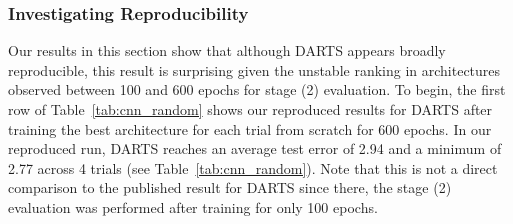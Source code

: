 \documentclass[acmlarge, nonacm]{acmart}
\begin{document}
\subsubsection{Investigating Reproducibility}
\label{ssec:cnn_reproduce}
Our results in this section show that although DARTS appears broadly reproducible, this result is surprising given the unstable ranking in architectures observed between 100 and 600 epochs for stage (2) evaluation.
To begin, the first row of Table~\ref{tab:cnn_random} shows our reproduced results for DARTS after training the best architecture for each trial from scratch for 600 epochs.  In our reproduced run, DARTS reaches an average test error of 2.94 and a minimum of 2.77 across 4 trials (see Table~\ref{tab:cnn_random}).  Note that this is not a direct comparison to the published result for DARTS since there, the stage (2) evaluation was performed after training for only 100 epochs.  
\begingroup
\setlength{\tabcolsep}{3pt}
\begin{table}[h]
    \centering
    \caption{\textbf{CIFAR-10 Benchmark: Ranking of Intermediate Test Error for DARTS.}  Architectures are retrained from scratch using the proxyless network and the error on the test set is reported after training for the indicated number of epochs.  Rank is calculated across the 4 trials.  We also show the average over 10 seeds for the best architecture from the top trial for reference.\\\hspace{\textwidth}
     These results were run before we fixed the non-determinism in DARTS code (see Appendix~\ref{ssec:appendix_reproduce}).}
    
    \label{tab:cnn_reproduce}
\end{table}
\endgroup
\end{document}
